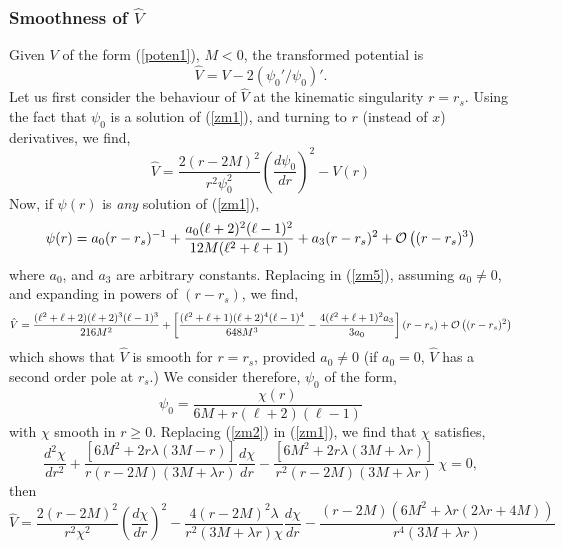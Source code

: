 \documentclass[aps,floats,showpacs,amssymb,tightenlines]{revtex4}
\begin{document}
\subsubsection{Smoothness of $\hat V$}

Given $V$ of the form (\ref{poten1}),  $M < 0$, the transformed  potential is
\begin{equation} \label{zm4}
\hat V = V - 2 (\psi_0' / \psi_0 )'.
\end{equation}
 Let us first consider the behaviour of $\hat V$  at the kinematic singularity $r=r_s$.
  Using the fact that $\psi_0$ is a solution of (\ref{zm1}), and turning to $r$ (instead of $x$) derivatives, we find,
\begin{equation}\label{zm5}
\hat{V} = \frac{2(r-2M)^2}{r^2 \psi_0^2}\left(\frac{d \psi_0}{dr}\right)^2 -V(r)
\end{equation}
Now, if $\psi(r)$ is {\em any} solution of (\ref{zm1}),
\begin{equation}\label{zm6}
\psi(r) = a_0 (r-r_s)^{-1}+\frac{a_0(\ell+2)^2(\ell-1)^2}{12 M(\ell^2+\ell+1)}
+a_3(r-r_s)^2+{\cal{O}}\left((r-r_s)^3\right)
\end{equation}
where $a_0$, and $a_3$ are arbitrary constants. Replacing in (\ref{zm5}), assuming $a_0 \neq 0$,
and expanding in powers of $(r-r_s)$, we find,
\begin{equation}\label{zm7}
\hat V = \frac{(\ell^2+\ell+2)(\ell+2)^3(\ell-1)^3}{216 M^2} +\left[\frac{(\ell^2+\ell+1)(\ell+2)^4(\ell-1)^4}{648 M^3}-\frac{4 (\ell^2+\ell+1)^2 a_3}{3 a_0}\right](r-r_s)+{\cal{O}}\left((r-r_s)^2\right)
\end{equation}
which shows that $\hat V$ is smooth for $r=r_s$, provided $a_0 \neq 0$ (if $a_0=0$, $\hat V$ has a second order
pole at $r_s$.) We consider therefore, $\psi_0$ of the form,
\begin{equation}\label{zm2}
\psi_0=\frac{\chi(r)}{6 M+r(\ell+2)(\ell-1)}
\end{equation}
with $\chi$ smooth in $ r \geq 0$. Replacing (\ref{zm2}) in (\ref{zm1}), we find that $\chi$ satisfies,
\begin{equation}\label{zm8}
\frac{d^2 \chi}{dr^2} +\frac{\left[6M^2+2 r \lambda(3M-r)\right]}{r(r-2M)(3M+\lambda r)}\frac{d \chi}{dr}
-\frac{\left[6M^2+2 r \lambda(3M+\lambda r)\right]}{r^2(r-2M)(3M+\lambda r)}\  \chi =0,
\end{equation}
then
\begin{equation}\label{zm5a}
\hat{V} = \frac{2(r-2M)^2}{r^2 \chi^2}\left(\frac{d\chi}{dr}\right)^2
-\frac{4(r-2M)^2 \lambda}{r^2 (3M+\lambda r) \chi}\frac{d\chi}{dr}-
\frac{(r-2M)(6M^2+\lambda r (2\lambda r+4M))} {r^4 (3M+\lambda r)}
\end{equation}
\end{document}
